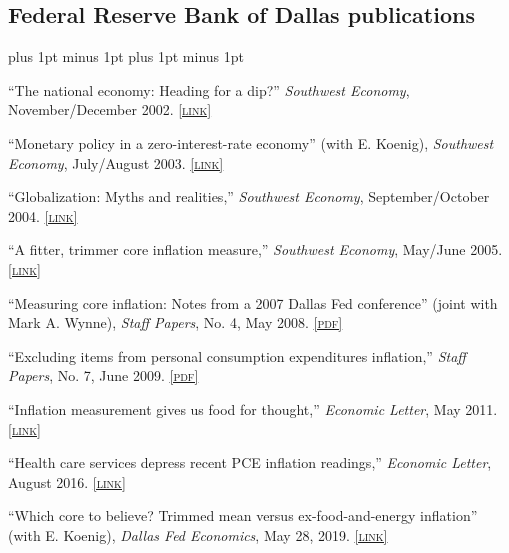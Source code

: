 \documentclass[letterpaper]{article}
\renewenvironment{itemize}{
  \begin{list}{}{
    \setlength{\leftmargin}{1.5em}
    \itemsep -1pt plus 1pt minus 1pt
    \topsep -1pt plus 1pt minus 1pt
  }
}{
  \end{list}
}
\newcommand{\pdf}[1]{\href{#1}{\scriptsize\textsc{[pdf]}}}
\newcommand{\link}[1]{\href{#1}{\scriptsize\textsc{[link]}}}
\begin{document}
\subsection*{Federal Reserve Bank of Dallas publications}
\begin{itemize}
\item ``The national economy: Heading for a dip?'' \textit{Southwest Economy}, November/December 2002. \link{https://www.dallasfed.org/~/media/documents/research/swe/2002/swe0206b.pdf}

\item ``Monetary policy in a zero-interest-rate economy'' (with E. Koenig), \textit{Southwest Economy}, July/August 2003. \link{https://www.dallasfed.org/~/media/documents/research/swe/2003/swe0304a.pdf}

\item ``Globalization: Myths and realities,'' \textit{Southwest Economy}, September/October 2004. \link{https://www.dallasfed.org/~/media/documents/research/swe/2004/swe0405c.pdf}

\item ``A fitter, trimmer core inflation measure,'' \textit{Southwest Economy}, May/June 2005. \link{https://www.dallasfed.org/~/media/documents/research/swe/2005/swe0503b.pdf}

\item ``Measuring core inflation: Notes from a 2007 Dallas Fed conference'' (joint with Mark A. Wynne), \textit{Staff Papers}, No. 4, May 2008. \pdf{http://www.dallasfed.org/assets/documents/research/staff/staff0802.pdf}

\item ``Excluding items from personal consumption expenditures inflation,'' \textit{Staff Papers}, No. 7, June 2009. \pdf{http://www.dallasfed.org/assets/documents/research/staff/staff0901.pdf}

\item ``Inflation measurement gives us food for thought,'' \textit{Economic Letter}, May 2011. \link{https://www.dallasfed.org/research/~/media/documents/research/eclett/2011/el1104.pdf}

\item ``Health care services depress recent PCE inflation readings,'' \textit{Economic Letter}, August 2016. \link{https://www.dallasfed.org/research/~/media/documents/research/eclett/2016/el1611.pdf}

\item ``Which core to believe? Trimmed mean versus ex-food-and-energy inflation'' (with E. Koenig), \textit{Dallas Fed Economics}, May 28, 2019. \link{https://www.dallasfed.org/research/economics/2019/0528}


\end{itemize}
\end{document}

